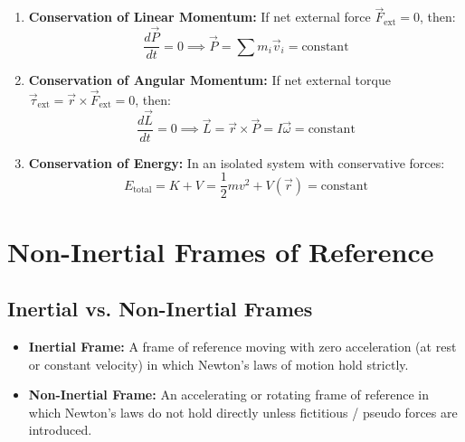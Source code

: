 \documentclass[12pt,a4paper]{article}
\begin{document}
\begin{tcolorbox}[formulabox, title={\textbf{Conservation Theorems}}]
\begin{enumerate}[leftmargin=*, itemsep=4pt]
  \item \textbf{Conservation of Linear Momentum:} If net external force $\vec{F}_{\text{ext}} = 0$, then:
  \begin{equation}
  \frac{d\vec{P}}{dt} = 0 \implies \vec{P} = \sum m_i \vec{v}_i = \text{constant}
  \end{equation}
  \item \textbf{Conservation of Angular Momentum:} If net external torque $\vec{\tau}_{\text{ext}} = \vec{r} \times \vec{F}_{\text{ext}} = 0$, then:
  \begin{equation}
  \frac{d\vec{L}}{dt} = 0 \implies \vec{L} = \vec{r} \times \vec{P} = I\vec{\omega} = \text{constant}
  \end{equation}
  \item \textbf{Conservation of Energy:} In an isolated system with conservative forces:
  \begin{equation}
  E_{\text{total}} = K + V = \frac{1}{2} m v^2 + V(\vec{r}) = \text{constant}
  \end{equation}
\end{enumerate}
\end{tcolorbox}

\section{Non-Inertial Frames of Reference}

\subsection{Inertial vs. Non-Inertial Frames}

\begin{tcolorbox}[defbox, title={\textbf{Definition: Frames of Reference}}]
\begin{itemize}[leftmargin=*, itemsep=2pt]
  \item \textbf{Inertial Frame:} A frame of reference moving with zero acceleration (at rest or constant velocity) in which Newton's laws of motion hold strictly.
  \item \textbf{Non-Inertial Frame:} An accelerating or rotating frame of reference in which Newton's laws do not hold directly unless fictitious / pseudo forces are introduced.
\end{itemize}
\end{tcolorbox}
\end{document}

